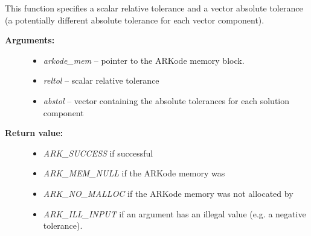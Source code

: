 \documentclass[letterpaper,10pt,english]{sphinxmanual}
\begin{document}
\begin{fulllineitems}
\label{c_interface/User_callable:c.ARKodeSVtolerances}
This function specifies a scalar relative tolerance and a vector
absolute tolerance (a potentially different absolute tolerance for
each vector component).
\begin{description}
\item[{\textbf{Arguments:}}] \leavevmode\begin{itemize}
\item {} 
\emph{arkode\_mem} -- pointer to the ARKode memory block.

\item {} 
\emph{reltol} -- scalar relative tolerance

\item {} 
\emph{abstol} -- vector containing the absolute tolerances for each
solution component

\end{itemize}

\item[{\textbf{Return value:}}] \leavevmode\begin{itemize}
\item {} 
\emph{ARK\_SUCCESS} if successful

\item {} 
\emph{ARK\_MEM\_NULL}  if the ARKode memory was 

\item {} 
\emph{ARK\_NO\_MALLOC}  if the ARKode memory was not allocated by {\hyperref[c_interface/User_callable:c.ARKodeInit]{\emph{}}}

\item {} 
\emph{ARK\_ILL\_INPUT} if an argument has an illegal value (e.g. a negative tolerance).

\end{itemize}

\end{description}

\end{fulllineitems}

\end{document}
